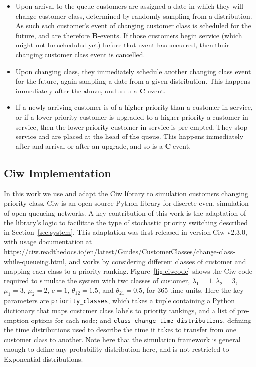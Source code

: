 \documentclass{article}
\begin{document}
\begin{itemize}
  \item Upon arrival to the queue customers are assigned a date in which they
  will change customer class, determined by randomly sampling from a
  distribution. As such each customer's event of changing customer class is
  scheduled for the future, and are therefore \textbf{B}-events. If those
  customers begin service (which might not be scheduled yet) before that event
  has occurred, then their changing customer class event is cancelled.
  \item Upon changing class, they immediately schedule another changing class
  event for the future, again sampling a date from a given distribution. This
  happens immediately after the above, and so is a \textbf{C}-event.
  \item If a newly arriving customer is of a higher priority than a customer in
  service, or if a lower priority customer is upgraded to a higher priority a
  customer in service, then the lower priority customer in service is
  pre-empted. They stop service and are placed at the head of the queue. This
  happens immediately after and arrival or after an upgrade, and so is a
  \textbf{C}-event.
\end{itemize}


\subsection{Ciw Implementation}
In this work we use and adapt the Ciw library \cite{palmer19} to simulation
customers changing priority class. Ciw is an open-source Python library for
discrete-event simulation of open queueing networks. A key contribution of this
work is the adaptation of the library's logic to facilitate the type of
stochastic priority switching described in Section~\ref{sec:system}.
This adaptation was first released in version Ciw v2.3.0, with usage
documentation at
\url{https://ciw.readthedocs.io/en/latest/Guides/CustomerClasses/change-class-while-queueing.html}, and works by considering different classes
of customer and mapping each class to a priority ranking.
Figure~\ref{fig:ciwcode} shows the Ciw code
required to simulate the system with two classes of customer, $\lambda_1 = 1$,
$\lambda_2 = 3$, $\mu_1 = 3$, $\mu_2 = 2$, $c = 1$, $\theta_{12} =1.5$, and
$\theta_{21} = 0.5$, for 365 time units. Here the key parameters are
\texttt{priority_classes}, which takes a tuple containing a Python
dictionary that maps
customer class labels to priority rankings, and a list of pre-emption options
for each node; and \texttt{class_change_time_distributions},
defining the time distributions used to describe the time it takes to transfer
from one customer class to another. Note here that the simulation framework is
general enough to define any probability distribution here, and is not
restricted to Exponential distributions.
\end{document}
